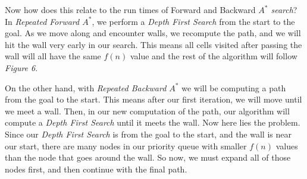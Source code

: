 Now how does this relate to the run times of Forward and Backward \emph{$A^*$ search}? In \emph{Repeated Forward $A^*$}, we perform a \emph{Depth First Search} from the start to the goal. As we move along and encounter walls, we recompute the path, and we will hit the wall very early in our search. This means all cells visited after passing the wall will all have the same $f(n)$ value and the rest of the algorithm will follow \emph{Figure 6}.


On the other hand, with \emph{Repeated Backward $A^*$} we will be computing a path from the goal to the start. This means after our first iteration, we will move until we meet a wall. Then, in our new computation of the path, our algorithm will compute a \emph{Depth First Search} until it meets the wall. Now here lies the problem. Since our \emph{Depth First Search} is from the goal to the start, and the wall is near our start, there are many nodes in our priority queue with smaller $f(n)$ values than the node that goes around the wall. So now, we must expand all of those nodes first, and then continue with the final path. 


